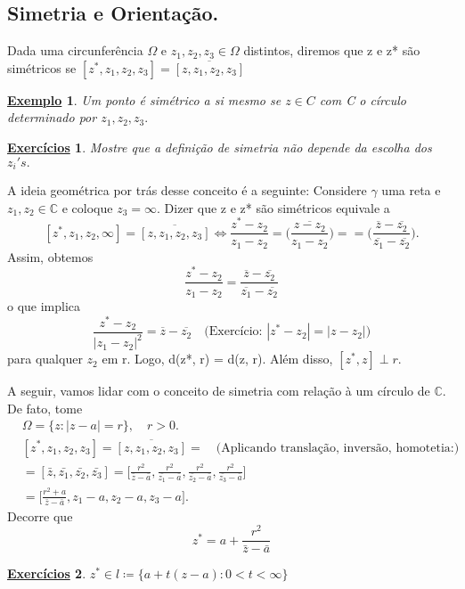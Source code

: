 \documentclass{article}
\newtheorem{example}{\underline{Exemplo}}[section]
\newtheorem*{exer*}{\underline{Exerc\'icios}}
\begin{document}
  \subsection{Simetria e Orienta\c c\~ao.}
  Dada uma circunfer\^encia $\Omega\text{ e }z_1, z_2, z_3\in \Omega$ distintos, diremos que z e z* s\~ao sim\'etricos se
  $[z^*, z_1, z_2, z_3] = \overline{[z, z_1, z_2, z_3]}$ 
  \begin{example}
    Um ponto \'e sim\'etrico a si mesmo se $z\in{C}$ com C o c\'irculo determinado por $z_1, z_2, z_3.$
  \end{example}
  \begin{exer*}
    Mostre que a defini\c c\~ao de simetria n\~ao depende da escolha dos $z_{i}'s.$
  \end{exer*}
  A ideia geom\'etrica por tr\'as desse conceito \'e a seguinte: Considere $\gamma$ uma reta e $z_1, z_2\in \mathbb{C}$
  e coloque $z_3 = \infty.$ Dizer que z e z* s\~ao sim\'etricos equivale a
  $$
  [z^*, z_1, z_2, \infty] = \overline{[z, z_1, z_2, z_3]}\Longleftrightarrow \frac{z^* - z_2}{z_1 - z_2} = \overline{\biggl(\frac{z - z_2}{z_1 - z_2}\biggr)} =
  = \biggl(\frac{\overline{z} - \overline{z_2}}{\overline{z_1} - \overline{z_2}}\biggr).
  $$
  Assim, obtemos
  $$
  \frac{z^* - z_2}{z_1 - z_2} = \frac{\overline{z} - \overline{z_2}}{\overline{z_1} - \overline{z_2}} 
  $$
  o que implica
  $$
  \frac{z^* - z_2}{|z_1 - z_2|^2} = \overline{z} - \overline{z_2} \quad \text{(Exerc\'icio: } |z^* - z_2| = |z - z_2|)
  $$
  para qualquer $z_2$ em r. Logo, d(z*, r) = d(z, r). Al\'em disso, $[z^*, z]\perp{r}.$

  A seguir, vamos lidar com o conceito de simetria com rela\c c\~ao \`a um c\'irculo de $\mathbb{C}.$ De fato, tome
  \begin{align*}
&\Omega = \{z: |z - a| = r\}, \quad r > 0. \\
&[z^*, z_1, z_2, z_3] = \overline{[z, z_1, z_2, z_3]} = \quad \text{(Aplicando transla\c c\~ao, invers\~ao, homotetia:)} \\
& = [\bar{z}, \bar{z_1}, \bar{z_2}, \bar{z_3}] = \biggl[\frac{r^2}{\bar{z} - \bar{a}}, \frac{r^2}{\bar{z_1} - \bar{a}}, \frac{r^2}{\bar{z_2} - \bar{a}}, \frac{r^2}{\bar{z_3} - \bar{a}}\biggr] \\
& = \biggl[\frac{r^2 + a}{\bar{z} - \bar{a}}, z_1 - a, z_2 - a, z_3 - a\biggr].
  \end{align*}
  Decorre que 
  $$
  z^* = a + \frac{r^2}{\bar{z} - \bar{a}}
  $$
  \begin{exer*}
    $z^*\in{l}\coloneqq  \{a + t(z-a): 0 < t < \infty\} $
  \end{exer*}
  \newpage
\end{document}
